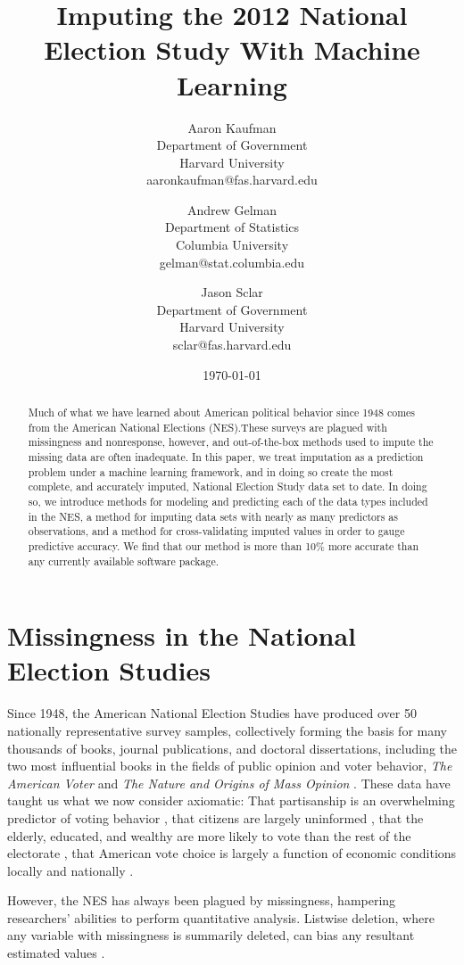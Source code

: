 \documentclass{article}
\title{Imputing the 2012 National Election Study With Machine Learning}
\author{
    Aaron Kaufman\\
    Department of Government\\
    Harvard University\\
    aaronkaufman@fas.harvard.edu
  \and
    Andrew Gelman\\
	Department of Statistics\\
	Columbia University\\
    gelman@stat.columbia.edu
  \and
  	Jason Sclar\\
  	Department of Government\\
  	Harvard University\\
  	sclar@fas.harvard.edu
}\date{\today}
\begin{document}
\maketitle

\begin{abstract}
Much of what we have learned about American political behavior since 1948 comes from the American National Elections (NES).These surveys are plagued with missingness and nonresponse, however, and out-of-the-box methods used to impute the missing data are often inadequate. In this paper, we treat imputation as a prediction problem under a machine learning framework, and in doing so create the most complete, and accurately imputed, National Election Study data set to date. In doing so, we introduce methods for modeling and predicting each of the data types included in the NES, a method for imputing data sets with nearly as many predictors as observations, and a method for cross-validating imputed values in order to gauge predictive accuracy. We find that our method is more than 10\% more accurate than any currently available software package. %
\end{abstract}

\section{Missingness in the National Election Studies}
Since 1948, the American National Election Studies have produced over 50 nationally representative survey samples, collectively forming the basis for many thousands of books, journal publications, and doctoral dissertations, including the two most influential books in the fields of public opinion and voter behavior, \textit{The American Voter} \citep{Campbell1960} and \textit{The Nature and Origins of Mass Opinion} \citep{Zaller1992}. These data have taught us what we now consider axiomatic: That partisanship is an overwhelming predictor of voting behavior \citep{green1994stable}, that citizens are largely uninformed \citep{converse1962nature}, that the elderly, educated, and wealthy are more likely to vote than the rest of the electorate \citep{wolfinger1980votes}, that American vote choice is largely a function of economic conditions locally and nationally \citep{Fiorina1978}.

However, the NES has always been plagued by missingness, hampering researchers' abilities to perform quantitative analysis. Listwise deletion, where any variable with missingness is summarily deleted, can bias any resultant estimated values \citep{enders2001relative}. 
\end{document}
